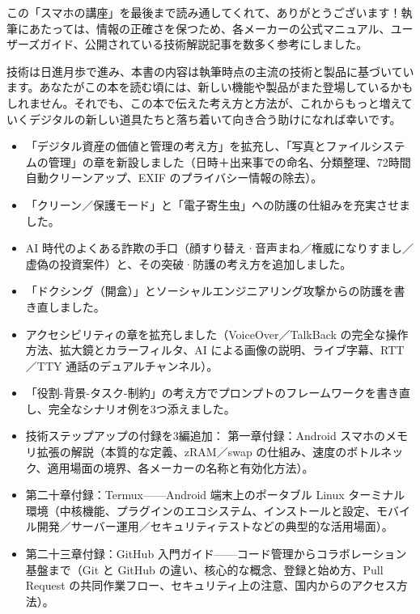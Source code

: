 
この「スマホの講座」を最後まで読み通してくれて、ありがとうございます！執筆にあたっては、情報の正確さを保つため、各メーカーの公式マニュアル、ユーザーズガイド、公開されている技術解説記事を数多く参考にしました。

技術は日進月歩で進み、本書の内容は執筆時点の主流の技術と製品に基づいています。あなたがこの本を読む頃には、新しい機能や製品がまた登場しているかもしれません。それでも、この本で伝えた考え方と方法が、これからもっと増えていくデジタルの新しい道具たちと落ち着いて向き合う助けになれば幸いです。


\begin{itemize}
  \item 「デジタル資産の価値と管理の考え方」を拡充し、「写真とファイルシステムの管理」の章を新設しました（日時＋出来事での命名、分類整理、72時間自動クリーンアップ、EXIF のプライバシー情報の除去）。
  \item 「クリーン／保護モード」と「電子寄生虫」への防護の仕組みを充実させました。
  \item AI 時代のよくある詐欺の手口（顔すり替え·音声まね／権威になりすまし／虚偽の投資案件）と、その突破·防護の考え方を追加しました。
  \item 「ドクシング（開盒）」とソーシャルエンジニアリング攻撃からの防護を書き直しました。
  \item アクセシビリティの章を拡充しました（VoiceOver／TalkBack の完全な操作方法、拡大鏡とカラーフィルタ、AI による画像の説明、ライブ字幕、RTT／TTY 通話のデュアルチャンネル）。
  \item 「役割-背景-タスク-制約」の考え方でプロンプトのフレームワークを書き直し、完全なシナリオ例を3つ添えました。
  \item 技術ステップアップの付録を3編追加： 第一章付録：Android スマホのメモリ拡張の解説（本質的な定義、zRAM／swap の仕組み、速度のボトルネック、適用場面の境界、各メーカーの名称と有効化方法）。
  \item 第二十章付録：Termux——Android 端末上のポータブル Linux ターミナル環境（中核機能、プラグインのエコシステム、インストールと設定、モバイル開発／サーバー運用／セキュリティテストなどの典型的な活用場面）。
  \item 第二十三章付録：GitHub 入門ガイド——コード管理からコラボレーション基盤まで（Git と GitHub の違い、核心的な概念、登録と始め方、Pull Request の共同作業フロー、セキュリティ上の注意、国内からのアクセス方法）。
\end{itemize}

